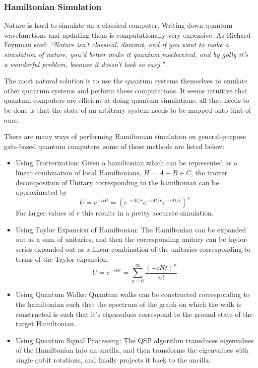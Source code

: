 \subsubsection{Hamiltonian Simulation}

Nature is hard to simulate on a classical computer. Writing down quantum wavefunctions and updating them is computationally very expensive. As Richard Feynman said: \textit{``Nature isn't classical, dammit, and if you want to make a simulation of nature, you'd better make it quantum mechanical, and by golly it's a wonderful problem, because it doesn't look so easy.''} \cite{feynman-quantum-simulating-physics}.

The most natural solution is to use the quantum systems themselves to emulate other quantum systems and perform these computations. It seems intuitive that quantum computers are efficient at doing quantum simulations, all that needs to be done is that the state of an arbitrary system needs to be mapped onto that of ours.

There are many ways of performing Hamiltonian simulation on general-purpose gate-based quantum computers, some of those methods are listed below:
\begin{itemize}
    \item Using Trotterization: Given a hamiltonian which can be represented as a linear combination of local Hamiltonians, $H = A + B + C$, the trotter decomposition of Unitary corresponding to the hamiltonian can be approximated by
    \begin{equation}
        U = e^{-i H t} = (e^{-i A t / r} e^{-i A t / r} e^{-i A t / r})^r
    \end{equation}
    For larger values of $r$ this results in a pretty accurate simulation.
    \item Using Taylor Expansion of Hamiltonian: The Hamiltonian can be expanded out as a sum of unitaries, and then the corresponding unitary can be taylor-series expanded out as a linear combination of the unitaries corresponding to terms of the Taylor expansion.
    \begin{equation}
        U = e^{-i H t} = \sum_{n=0}^{\infty} \frac{(-i H t)^n}{n!}
    \end{equation}
    \item Using Quantum Walks: Quantum walks can be constructed corresponding to the hamiltonian such that the spectrum of the graph on which the walk is constructed is such that it's eigenvalues correspond to the ground state of the target Hamiltonian.
    \item Using Quantum Signal Processing: The QSP algorithm transduces eigenvalues of the Hamiltonian into an ancilla, and then transforms the eigenvalues with single qubit rotations, and finally projects it back to the ancilla.
\end{itemize}


